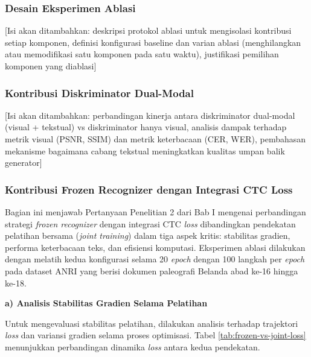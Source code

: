\documentclass[12pt,a4paper]{article}
\begin{document}
\subsubsection{Desain Eksperimen Ablasi}
\label{subsubsec:desain-ablasi}

[Isi akan ditambahkan: deskripsi protokol ablasi untuk mengisolasi kontribusi setiap komponen, definisi konfigurasi baseline dan varian ablasi (menghilangkan atau memodifikasi satu komponen pada satu waktu), justifikasi pemilihan komponen yang diablasi]

\vspace{0.8em}

\subsubsection{Kontribusi Diskriminator Dual-Modal}
\label{subsubsec:kontribusi-dual-modal}

[Isi akan ditambahkan: perbandingan kinerja antara diskriminator dual-modal (visual + tekstual) vs diskriminator hanya visual, analisis dampak terhadap metrik visual (PSNR, SSIM) dan metrik keterbacaan (CER, WER), pembahasan mekanisme bagaimana cabang tekstual meningkatkan kualitas umpan balik generator]

\vspace{0.8em}

\subsubsection{Kontribusi Frozen Recognizer dengan Integrasi CTC Loss}
\label{subsubsec:kontribusi-frozen-recognizer}

Bagian ini menjawab Pertanyaan Penelitian 2 dari Bab I mengenai perbandingan strategi \textit{frozen recognizer} dengan integrasi CTC \textit{loss} dibandingkan pendekatan pelatihan bersama (\textit{joint training}) dalam tiga aspek kritis: stabilitas gradien, performa keterbacaan teks, dan efisiensi komputasi. Eksperimen ablasi dilakukan dengan melatih kedua konfigurasi selama 20 \textit{epoch} dengan 100 langkah per \textit{epoch} pada dataset ANRI yang berisi dokumen paleografi Belanda abad ke-16 hingga ke-18.

\vspace{0.5em}

\textbf{a) Analisis Stabilitas Gradien Selama Pelatihan}

Untuk mengevaluasi stabilitas pelatihan, dilakukan analisis terhadap trajektori \textit{loss} dan variansi gradien selama proses optimisasi. Tabel \ref{tab:frozen-vs-joint-loss} menunjukkan perbandingan dinamika \textit{loss} antara kedua pendekatan.
\end{document}
